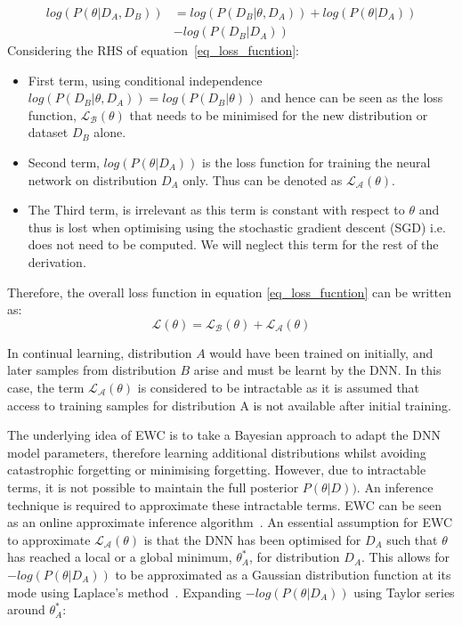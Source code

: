 \begin{equation}\label{eq_loss_fucntion}
\begin{split}
log(P(\theta|D_A,D_B))&=log(P(D_B|\theta,D_A))+log(P(\theta|D_A)) 
\\
& - log(P(D_B|D_A))
\end{split}
\end{equation}
Considering the RHS of equation~\ref{eq_loss_fucntion}:
\begin{itemize}
    \item First term, using conditional independence $log(P(D_B|\theta,D_A)) = log(P(D_B|\theta))$ and hence can be seen as the loss function, $\mathcal{L_B}(\theta)$ that needs to be minimised for the new distribution or dataset $D_B$ alone.
%
    \item Second term, $log(P(\theta|D_A))$ is the loss function for training the neural network on distribution $D_A$ only. Thus can be denoted as $\mathcal{L_A}(\theta)$. 
%
    \item The Third term, is irrelevant as this term is constant with respect to $\theta$ and thus is lost when optimising using the stochastic gradient descent (SGD) i.e. does not need to be computed. We will neglect this term for the rest of the derivation.
\end{itemize}
%
Therefore, the overall loss function in equation \ref{eq_loss_fucntion} can be written as:
%
\begin{equation}\label{eq_loss_fucntion_short}
\mathcal{L}(\theta)=\mathcal{L_B}(\theta)+\mathcal{L_A}(\theta)
\end{equation}

In continual learning, distribution $A$ would have been trained on initially, and later samples from distribution $B$ arise and must be learnt by the DNN.
%
In this case, the term $\mathcal{L_A}(\theta)$ is considered to be intractable as it is assumed that access to training samples for distribution A is not available after initial training.

The underlying idea of EWC is to take a Bayesian approach to adapt the DNN model parameters, therefore learning additional distributions whilst avoiding catastrophic forgetting or minimising forgetting. 
%
However, due to intractable terms, it is not possible to maintain the full posterior $P(\theta|D))$.
%
An inference technique is required to approximate these intractable terms. 
%
EWC can be seen as an online approximate inference algorithm~\cite{Huszar2018}.
%
An essential assumption for EWC to approximate $\mathcal{L_A}(\theta)$ is that the DNN has been optimised for $D_A$ such that $\theta$ has reached a local or a global minimum, $\theta^{*}_{A}$, for distribution $D_A$.
%
This allows for $-log(P(\theta|D_A))$ to be approximated as a Gaussian distribution function at its mode using Laplace's method~\cite{MacKay2003}. 
%
Expanding $-log(P(\theta|D_A))$ using Taylor series around $\theta^{*}_{A}$: 

